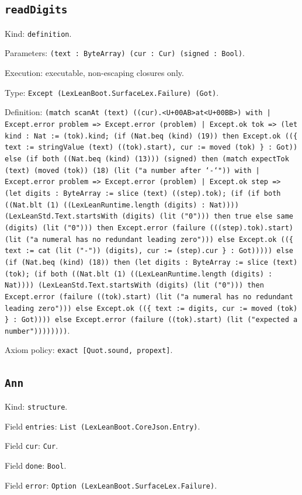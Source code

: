 \documentclass[11pt]{article}
\begin{document}
\subsection*{\texttt{readDigits}}
\noindent Kind: \texttt{definition}.\par
\noindent Parameters: \texttt{(text : ByteArray) (cur : Cur) (signed : Bool)}.\par
\noindent Execution: executable, non-escaping closures only.\par
\noindent Type: \texttt{Except (LexLeanBoot.SurfaceLex.Failure) (Got)}.\par
\noindent Definition: \texttt{(match scanAt (text) ((cur).<U+00AB>at<U+00BB>) with | Except.error problem => Except.error (problem) | Except.ok tok => (let kind : Nat := (tok).kind; (if (Nat.beq (kind) (19)) then Except.ok ((\{ text := stringValue (text) ((tok).start), cur := moved (tok) \} : Got)) else (if both ((Nat.beq (kind) (13))) (signed) then (match expectTok (text) (moved (tok)) (18) (lit ("a number after `-`")) with | Except.error problem => Except.error (problem) | Except.ok step => (let digits : ByteArray := slice (text) ((step).tok); (if (if both ((Nat.blt (1) ((LexLeanRuntime.length (digits) : Nat)))) (LexLeanStd.Text.startsWith (digits) (lit ("0"))) then true else same (digits) (lit ("0"))) then Except.error (failure (((step).tok).start) (lit ("a numeral has no redundant leading zero"))) else Except.ok ((\{ text := cat (lit ("-")) (digits), cur := (step).cur \} : Got))))) else (if (Nat.beq (kind) (18)) then (let digits : ByteArray := slice (text) (tok); (if both ((Nat.blt (1) ((LexLeanRuntime.length (digits) : Nat)))) (LexLeanStd.Text.startsWith (digits) (lit ("0"))) then Except.error (failure ((tok).start) (lit ("a numeral has no redundant leading zero"))) else Except.ok ((\{ text := digits, cur := moved (tok) \} : Got)))) else Except.error (failure ((tok).start) (lit ("expected a number"))))))))}.\par
\noindent Axiom policy: \texttt{exact [Quot.sound, propext]}.\par
\subsection*{\texttt{Ann}}
\noindent Kind: \texttt{structure}.\par
\noindent Field \texttt{entries}: \texttt{List (LexLeanBoot.CoreJson.Entry)}.\par
\noindent Field \texttt{cur}: \texttt{Cur}.\par
\noindent Field \texttt{done}: \texttt{Bool}.\par
\noindent Field \texttt{error}: \texttt{Option (LexLeanBoot.SurfaceLex.Failure)}.\par
\end{document}
